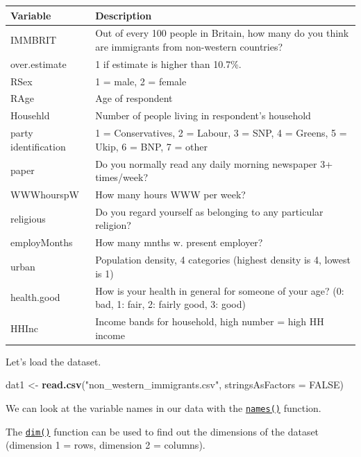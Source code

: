 \documentclass[]{article}
\newenvironment{Shaded}{\begin{snugshade}}{\end{snugshade}}
\newcommand{\DataTypeTok}[1]{\textcolor[rgb]{0.13,0.29,0.53}{#1}}
\newcommand{\KeywordTok}[1]{\textcolor[rgb]{0.13,0.29,0.53}{\textbf{#1}}}
\newcommand{\NormalTok}[1]{#1}
\newcommand{\OtherTok}[1]{\textcolor[rgb]{0.56,0.35,0.01}{#1}}
\newcommand{\StringTok}[1]{\textcolor[rgb]{0.31,0.60,0.02}{#1}}
\begin{document}
\begin{tabular}{l|l}
\hline
Variable & Description\\
\hline
IMMBRIT & Out of every 100 people in Britain, how many do you think are immigrants from non-western countries?\\
\hline
over.estimate & 1 if estimate is higher than 10.7\%.\\
\hline
RSex & 1 = male, 2 = female\\
\hline
RAge & Age of respondent\\
\hline
Househld & Number of people living in respondent's household\\
\hline
party identification & 1 = Conservatives, 2 = Labour, 3 = SNP, 4 = Greens, 5 = Ukip, 6 = BNP, 7 = other\\
\hline
paper & Do you normally read any daily morning newspaper 3+ times/week?\\
\hline
WWWhourspW & How many hours WWW per week?\\
\hline
religious & Do you regard yourself as belonging to any particular religion?\\
\hline
employMonths & How many mnths w. present employer?\\
\hline
urban & Population density, 4 categories (highest density is 4, lowest is 1)\\
\hline
health.good & How is your health in general for someone of your age? (0: bad, 1: fair, 2: fairly good, 3: good)\\
\hline
HHInc & Income bands for household, high number = high HH income\\
\hline
\end{tabular}

Let's load the dataset.

\begin{Shaded}
\begin{Highlighting}[]
\NormalTok{dat1 <-}\StringTok{ }\KeywordTok{read.csv}\NormalTok{(}\StringTok{"non_western_immigrants.csv"}\NormalTok{, }\DataTypeTok{stringsAsFactors =} \OtherTok{FALSE}\NormalTok{)}
\end{Highlighting}
\end{Shaded}

We can look at the variable names in our data with the \href{http://bit.ly/R_names}{\texttt{names()}} function.

The \href{http://bit.ly/R_dim}{\texttt{dim()}} function can be used to find out the dimensions of the dataset (dimension 1 = rows, dimension 2 = columns).
\end{document}
